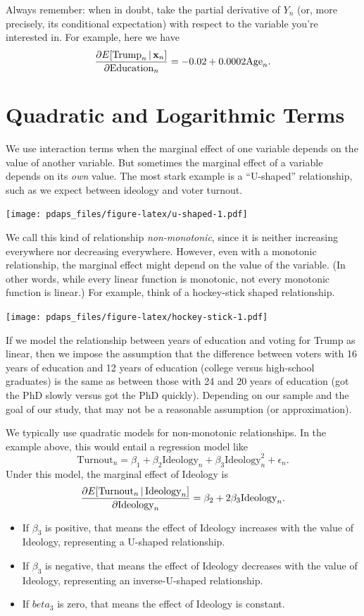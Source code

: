 \documentclass[12pt,oneside,openany]{book}
\begin{document}
Always remember: when in doubt, take the partial derivative of \(Y_n\)
(or, more precisely, its conditional expectation) with respect to the
variable you're interested in. For example, here we have \[
\frac{\partial E[\text{Trump}_n \,|\, \mathbf{x}_n]}{\partial \text{Education}_n} = -0.02 + 0.0002 \text{Age}_n.
\]

\section{Quadratic and Logarithmic
Terms}\label{quadratic-and-logarithmic-terms}

We use interaction terms when the marginal effect of one variable
depends on the value of another variable. But sometimes the marginal
effect of a variable depends on its \emph{own} value. The most stark
example is a ``U-shaped'' relationship, such as we expect between
ideology and voter turnout.

\texttt{[image: pdaps\_files/figure-latex/u-shaped-1.pdf]}

We call this kind of relationship \emph{non-monotonic}, since it is
neither increasing everywhere nor decreasing everywhere. However, even
with a monotonic relationship, the marginal effect might depend on the
value of the variable. (In other words, while every linear function is
monotonic, not every monotonic function is linear.) For example, think
of a hockey-stick shaped relationship.

\texttt{[image: pdaps\_files/figure-latex/hockey-stick-1.pdf]}

If we model the relationship between years of education and voting for
Trump as linear, then we impose the assumption that the difference
between voters with 16 years of education and 12 years of education
(college versus high-school graduates) is the same as between those with
24 and 20 years of education (got the PhD slowly versus got the PhD
quickly). Depending on our sample and the goal of our study, that may
not be a reasonable assumption (or approximation).

We typically use quadratic models for non-monotonic relationships. In
the example above, this would entail a regression model like \[
\text{Turnout}_n = \beta_1 + \beta_2 \text{Ideology}_n + \beta_3 \text{Ideology}_n^2 + \epsilon_n.
\] Under this model, the marginal effect of Ideology is \[
\frac{\partial E[\text{Turnout}_n \,|\, \text{Ideology}_n]}{\partial \text{Ideology}_n}
= \beta_2 + 2 \beta_3 \text{Ideology}_n.
\]

\begin{itemize}
\item
  If \(\beta_3\) is positive, that means the effect of Ideology
  increases with the value of Ideology, representing a U-shaped
  relationship.
\item
  If \(\beta_3\) is negative, that means the effect of Ideology
  decreases with the value of Ideology, representing an inverse-U-shaped
  relationship.
\item
  If \(beta_3\) is zero, that means the effect of Ideology is constant.
\end{itemize}
\end{document}

